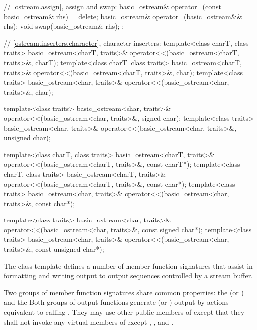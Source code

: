 \begin{codeblock}
{{    // \ref{ostream.assign}, assign and swap:
    basic_ostream& operator=(const basic_ostream& rhs) = delete;
    basic_ostream& operator=(basic_ostream&& rhs);
    void swap(basic_ostream& rhs);
  };

  // \ref{ostream.inserters.character}, character inserters:
  template<class charT, class traits>
    basic_ostream<charT, traits>& operator<<(basic_ostream<charT, traits>&,
                                             charT);
  template<class charT, class traits>
    basic_ostream<charT, traits>& operator<<(basic_ostream<charT, traits>&,
                                             char);
  template<class traits>
    basic_ostream<char, traits>& operator<<(basic_ostream<char, traits>&,
                                            char);

  template<class traits>
    basic_ostream<char, traits>& operator<<(basic_ostream<char, traits>&,
                                            signed char);
  template<class traits>
    basic_ostream<char, traits>& operator<<(basic_ostream<char, traits>&,
                                            unsigned char);

  template<class charT, class traits>
    basic_ostream<charT, traits>& operator<<(basic_ostream<charT, traits>&,
                                             const charT*);
  template<class charT, class traits>
    basic_ostream<charT, traits>& operator<<(basic_ostream<charT, traits>&,
                                             const char*);
  template<class traits>
    basic_ostream<char, traits>& operator<<(basic_ostream<char, traits>&,
                                            const char*);

  template<class traits>
    basic_ostream<char, traits>& operator<<(basic_ostream<char, traits>&,
                                            const signed char*);
  template<class traits>
    basic_ostream<char, traits>& operator<<(basic_ostream<char, traits>&,
                                            const unsigned char*);
}
\end{codeblock}

\pnum
The class template
defines a number of member function
signatures that assist in formatting and writing output to output sequences
controlled by a stream buffer.

\pnum
Two groups of member function signatures share common properties:
the
(or
)
and the
Both groups of output functions generate (or
)
output
by actions equivalent to calling
.
They may use other public members of
except that they shall not invoke any virtual members of
except
,
,
and
.

